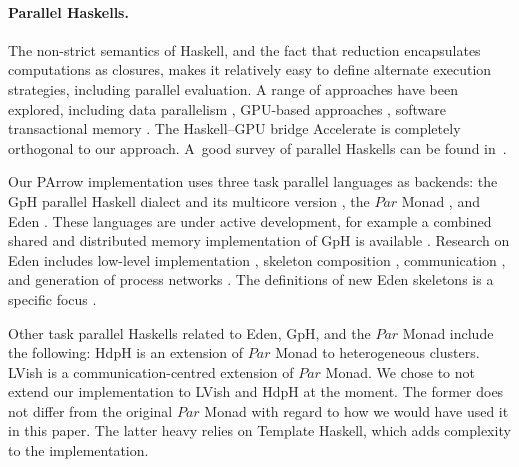 \documentclass{jfp1}
\newcommand{\Conid}[1]{\mathit{#1}}
\renewcommand{\cite}[1]{\citep{#1}}
\begin{document}
\paragraph{Parallel Haskells.}
The non-strict semantics of Haskell, and the fact that reduction encapsulates computations as closures, makes it relatively easy to define alternate execution strategies, including parallel evaluation. A range of approaches have been explored, including data parallelism \cite{Chakravarty2007,Keller:2010:RSP:1932681.1863582}, GPU-based approaches \cite{Mainland:2010:NEC:2088456.1863533,obsidian-phd}, software transactional memory \cite{Harris:2005:CMT:1065944.1065952,Perfumo:2008:LST:1366230.1366241}.
The Haskell--GPU bridge Accelerate
\cite{Chakravarty:2011:AHA:1926354.1926358,CMCK14,McDonell:2015:TRC:2887747.2804313}
is completely orthogonal to our approach.
A~good survey of parallel Haskells can be found in~\citet{marlow2013parallel}.

Our PArrow implementation uses three task parallel languages as backends: the GpH \cite{Trinder1996,Trinder1998a} parallel Haskell dialect and its multicore version \cite{Marlow2009}, the \ensuremath{\Conid{Par}} Monad \cite{par-monad,Foltzer:2012:MPC:2398856.2364562}, and Eden \cite{eden,Loogen2012}. These languages are under active development, for example a combined shared and distributed memory implementation of GpH is available \cite{Aljabri:2013:DIG:2620678.2620682,Aljabri2015}.
Research on Eden includes low-level  implementation
\cite{JostThesis,berthold_loidl_hammond_2016}, skeleton composition
\cite{dieterle_horstmeyer_loogen_berthold_2016}, communication \cite{Dieterle2010}, and generation of process networks \cite{Horstmeyer2013}. The definitions of new Eden skeletons is a specific focus \cite{doi:10.1142/S0129626403001380,Eden:PARCO05,Berthold2009-mr,Berthold2009-fft,dieterle2010skeleton,delaEncina2011,Dieterle2013,janjic2013space}.

Other task parallel Haskells related to Eden, GpH, and the \ensuremath{\Conid{Par}} Monad include the following: 
HdpH \cite{Maier:2014:HDS:2775050.2633363,stewart_maier_trinder_2016} is an extension of \ensuremath{\Conid{Par}} Monad to
heterogeneous clusters. LVish \cite{Kuper:2014:TPE:2666356.2594312} is a communication-centred extension
of \ensuremath{\Conid{Par}} Monad.
We chose to not extend our implementation to LVish and HdpH at the moment. The former does not differ from the original \ensuremath{\Conid{Par}} Monad with regard to how we would have used it in this paper. The latter heavy relies on Template Haskell, which adds complexity to the implementation.
\end{document}

